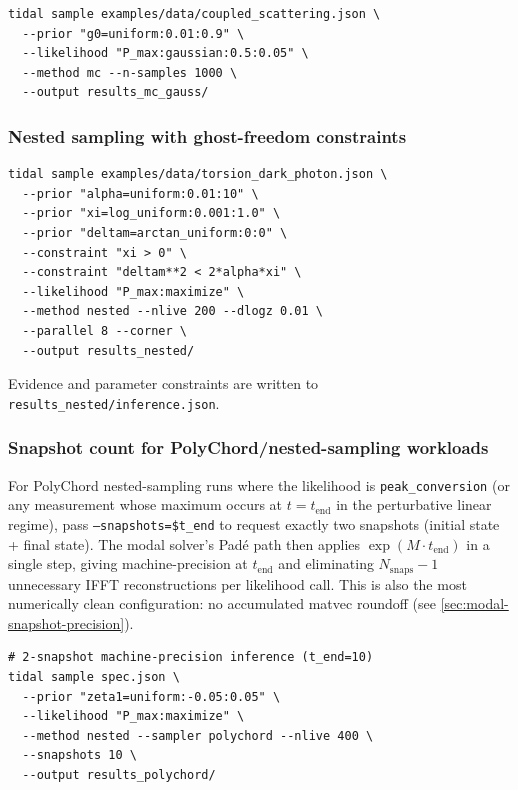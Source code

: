 \begin{lstlisting}[style=bash]
tidal sample examples/data/coupled_scattering.json \
  --prior "g0=uniform:0.01:0.9" \
  --likelihood "P_max:gaussian:0.5:0.05" \
  --method mc --n-samples 1000 \
  --output results_mc_gauss/
\end{lstlisting}

\subsubsection{Nested sampling with ghost-freedom constraints}

\begin{lstlisting}[style=bash]
tidal sample examples/data/torsion_dark_photon.json \
  --prior "alpha=uniform:0.01:10" \
  --prior "xi=log_uniform:0.001:1.0" \
  --prior "deltam=arctan_uniform:0:0" \
  --constraint "xi > 0" \
  --constraint "deltam**2 < 2*alpha*xi" \
  --likelihood "P_max:maximize" \
  --method nested --nlive 200 --dlogz 0.01 \
  --parallel 8 --corner \
  --output results_nested/
\end{lstlisting}

Evidence and parameter constraints are written to
\texttt{results\_nested/inference.json}.

\subsubsection{Snapshot count for PolyChord/nested-sampling workloads}
\label{sec:inference-snapshot-guidance}

For PolyChord nested-sampling runs where the likelihood is
\texttt{peak\_conversion} (or any measurement whose maximum occurs at
$t = t_\mathrm{end}$ in the perturbative linear regime), pass
\texttt{--snapshots=\$t\_end} to request exactly two snapshots
(initial state + final state). The modal solver's Pad\'{e} path then
applies $\exp(M \cdot t_\mathrm{end})$ in a single step, giving
machine-precision at $t_\mathrm{end}$ and eliminating $N_\mathrm{snaps}-1$
unnecessary IFFT reconstructions per likelihood call. This is also the
most numerically clean configuration: no accumulated matvec roundoff
(see \cref{sec:modal-snapshot-precision}).

\begin{lstlisting}[style=bash]
# 2-snapshot machine-precision inference (t_end=10)
tidal sample spec.json \
  --prior "zeta1=uniform:-0.05:0.05" \
  --likelihood "P_max:maximize" \
  --method nested --sampler polychord --nlive 400 \
  --snapshots 10 \
  --output results_polychord/
\end{lstlisting}

